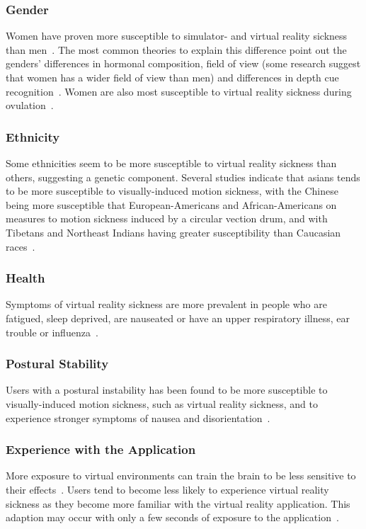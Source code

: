 \subsubsection{Gender}
Women have proven more susceptible to simulator- and virtual reality sickness than men~\citep{Kennedy1985}. 
The most common theories to explain this difference point out the genders' differences
in hormonal composition, field of view (some research suggest that women has a wider field of view than men) and differences in depth cue recognition~\citep{Biomed2012}. 
Women are also most susceptible to virtual reality sickness during ovulation~\citep{Clemes2005}.

\subsubsection{Ethnicity}
Some ethnicities seem to be more susceptible to virtual reality sickness than others, suggesting a genetic component. 
Several studies indicate that asians tends to be more susceptible to visually-induced motion sickness,
with the Chinese being more susceptible that European-Americans and African-Americans on measures to motion sickness induced by a circular vection drum, and with
Tibetans and Northeast Indians having greater susceptibility than Caucasian races~\citep{Barrett2004}.

\subsubsection{Health}
Symptoms of virtual reality sickness are more prevalent in people who are fatigued, sleep deprived, are nauseated or have an upper respiratory illness, 
ear trouble or influenza~\citep{Kolasinski1995}.

\subsubsection{Postural Stability}
Users with a postural instability has been found to be more susceptible to visually-induced motion sickness, such as virtual reality sickness, and to experience
stronger symptoms of nausea and disorientation~\citep{Kolasinski1995}. 

\subsubsection{Experience with the Application}
More exposure to virtual environments can train the brain to be less sensitive to their effects~\citep{Stanney2003}. Users tend to become less likely to experience
virtual reality sickness as they become more familiar with the virtual reality application. This adaption may occur with only a few seconds of exposure to the application~\citep{Kennedy1985}.\\

